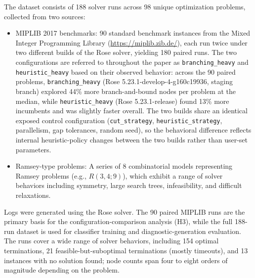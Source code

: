 \documentclass[11pt]{article}
\begin{document}
The dataset consists of 188 solver runs across 98 unique optimization problems, collected from two sources:
\begin{itemize}
    \item MIPLIB 2017 benchmarks: 90 standard benchmark instances from the Mixed Integer Programming Library (\url{https://miplib.zib.de/}),
    each run twice under two different builds of the Rose solver, yielding 180 paired runs. The two configurations are referred to throughout the paper as \texttt{branching\_heavy} and \texttt{heuristic\_heavy} based on their observed behavior: across the 90 paired problems, \texttt{branching\_heavy} (Rose 5.23.1-develop-4-g160c19936, staging branch) explored 44\% more branch-and-bound nodes per problem at the median, while \texttt{heuristic\_heavy} (Rose 5.23.1-release) found 13\% more incumbents and was slightly faster overall. The two builds share an identical exposed control configuration (\texttt{cut\_strategy}, \texttt{heuristic\_strategy}, parallelism, gap tolerances, random seed), so the behavioral difference reflects internal heuristic-policy changes between the two builds rather than user-set parameters.
    \item Ramsey-type problems: A series of 8 combinatorial models representing Ramsey problems (e.g., $R(3,4;9)$), which exhibit
    a range of solver behaviors including symmetry, large search trees, infeasibility, and difficult relaxations.
\end{itemize}

Logs were generated using the Rose solver. The 90 paired MIPLIB runs are the primary basis for the configuration-comparison analysis (H3), while the full 188-run dataset is used for classifier training and diagnostic-generation evaluation. The runs cover a wide range of solver behaviors, including 154 optimal terminations, 21 feasible-but-suboptimal terminations (mostly timeouts), and 13 instances with no solution found; node counts span four to eight orders of magnitude depending on the problem.
\end{document}
